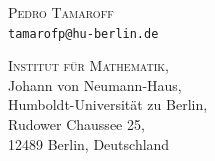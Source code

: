 \documentclass[fleqn, a4paper, twoside]{article}
\newcommand{\0}{\langle 0\rangle}
\DeclareRobustCommand{\[}{\begin{equation}}%
\DeclareRobustCommand{\]}{\end{equation}}%
\theoremstyle{mytheorem}
\theoremstyle{introthm}
\theoremstyle{mydefinition}
\theoremstyle{mydefinition2}
\theoremstyle{plain} %
\theoremstyle{mytheorem}
\newcommand{\myauthor}[3]{
\noindent
\begin{minipage}[t]{.45\textwidth}
\begin{flushright}
\textsc{#1} \\
{\footnotesize\texttt{#2}}
\end{flushright} 
\end{minipage}
\qquad
\begin{minipage}[t]{.45\textwidth}
#3
\end{minipage}
}
\newcommand\blankpage{%
    \null
    \thispagestyle{empty}%
    \newpage}
\begin{document}
\bigskip

\begin{small}
	\myauthor{Pedro Tamaroff}{tamarofp@hu-berlin.de}
	{
		\textsc{Institut für Mathematik},	\\ 
		Johann von Neumann-Haus, 			\\
		Humboldt-Universität zu Berlin, 	\\
		Rudower Chaussee 25, 				\\
		12489 Berlin, Deutschland
									}
\end{small} \afterpage{\blankpage}
\vspace*{\fill} 
\newpage

\thispagestyle{empty}
\tableofcontents
\afterpage{\blankpage}
\newpage

 
\newpage


\afterpage{\blankpage}
\newpage


\afterpage{\blankpage}
\newpage


\afterpage{\blankpage}
\newpage


\newpage


\newpage


\afterpage{\blankpage}
\newpage
 

\newpage


\newpage


\afterpage{\blankpage}
\newpage


\afterpage{\blankpage}
\newpage


\newpage


\newpage 

\appendix


\newpage

\listoftodos



\end{document}
